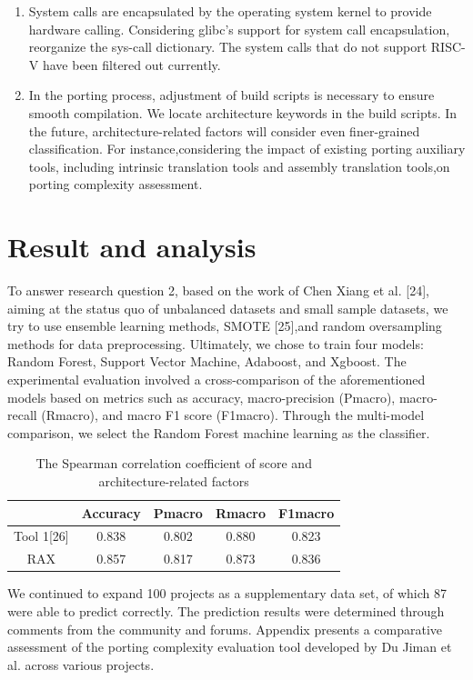 \documentclass[sigconf,screen,review,anonymous]{acmart}
\begin{document}
\begin{enumerate}
  \item System calls are encapsulated by the operating system kernel to provide hardware calling.
  Considering glibc's support for system call encapsulation, reorganize the sys-call dictionary.
  The system calls that do not support RISC-V have been filtered out currently.
  \item In the porting process, adjustment of build scripts is necessary to ensure smooth compilation.
  We locate architecture keywords in the build scripts.
  In the future, architecture-related factors will consider even finer-grained classification.
  For instance,considering the impact of existing porting auxiliary tools, including intrinsic translation tools and assembly translation tools,on porting complexity assessment.
\end{enumerate}

\section{Result and analysis}

To answer research question 2, based on the work of Chen Xiang et al. [24], aiming at the status quo of unbalanced datasets and small sample datasets, we try to use ensemble learning methods, SMOTE [25],and random oversampling methods for data preprocessing.
Ultimately, we chose to train four models: Random Forest, Support Vector Machine, Adaboost, and Xgboost.
The experimental evaluation involved a cross-comparison of the aforementioned models based on metrics such as accuracy, macro-precision (Pmacro), macro-recall (Rmacro), and macro F1 score (F1macro).
Through the multi-model comparison, we select the Random Forest machine learning as the classifier.

\begin{table}
  \caption{The Spearman correlation coefficient of score and architecture-related factors}
  \label{tab:evaluation}
  \begin{tabular}{ccccc}
    \toprule
     & Accuracy & Pmacro & Rmacro & F1macro \\
    \midrule
    Tool 1[26] & 0.838 & 0.802 & 0.880 & 0.823 \\
    RAX & 0.857 & 0.817 & 0.873 & 0.836 \\
  \bottomrule
\end{tabular}
\end{table}

We continued to expand 100 projects as a supplementary data set, of which 87 were able to predict correctly.
The prediction results were determined through comments from the community and forums.
Appendix presents a comparative assessment of the porting complexity evaluation tool developed by Du Jiman et al. across various projects.
\end{document}
